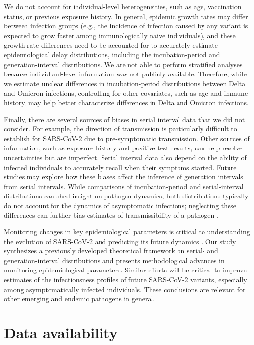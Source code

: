 \documentclass[12pt]{article}
\begin{document}
We do not account for individual-level heterogeneities, such as age, vaccination status, or previous exposure history.
In general, epidemic growth rates may differ between infection groups (e.g., the incidence of infection caused by any variant is expected to grow faster among immunologically naive individuals), and these growth-rate differences need to be accounted for to accurately estimate epidemiological delay distributions, including the incubation-period and generation-interval distributions.
We are not able to perform stratified analyses because individiaul-level information was not publicly available.
Therefore, while we estimate unclear differences in incubation-period distributions between Delta and Omicron infections, controlling for other covariates, such as age and immune history, may help better characterize differences in Delta and Omicron infections.

Finally, there are several sources of biases in serial interval data that we did not consider.
For example, the direction of transmission is particularly difficult to establish for SARS-CoV-2 due to pre-symptomatic transmission.
Other sources of information, such as exposure history and positive test results, can help resolve uncertainties but are imperfect.
Serial interval data also depend on the ability of infected individuals to accurately recall when their symptoms started.
Future studies may explore how these biases affect the inference of generation intervals from serial intervals.
While comparisons of incubation-period and serial-interval distributions can shed insight on pathogen dynamics, both distributions typically do not account for the dynamics of asymptomatic infections; neglecting these differences can further bias estimates of transmissibility of a pathogen \citep{park2020time}.

Monitoring changes in key epidemiological parameters is critical to understanding the evolution of SARS-CoV-2 and predicting its future dynamics \citep{kraemer2021monitoring}.
Our study synthesizes a previously developed theoretical framework on serial- and generation-interval distributions and presents methodological advances in monitoring epidemiological parameters.
Similar efforts will be critical to improve estimates of the infectiousness profiles of future SARS-CoV-2 variants, especially among asymptomatically infected individuals.
These conclusions are relevant for other emerging and endemic pathogens in general.

\section*{Data availability}
\end{document}
